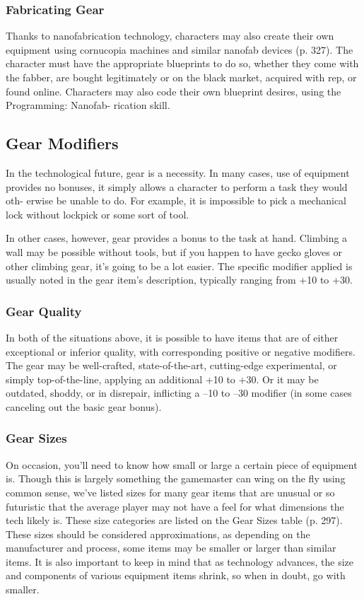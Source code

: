 \subsubsection{Fabricating Gear}

Thanks to nanofabrication technology, characters may 
also create their own equipment using cornucopia 
machines and similar nanofab devices (p. 327). The 
character must have the appropriate blueprints to do 
so, whether they come with the fabber, are bought 
legitimately or on the black market, acquired with rep, 
or found online. Characters may also code their own 
blueprint desires, using the Programming: Nanofab-
rication skill.

\subsection{Gear Modifiers}

In the technological future, gear is a necessity. In many 
cases, use of equipment provides no bonuses, it simply 
allows a character to perform a task they would oth-
erwise be unable to do. For example, it is impossible 
to pick a mechanical lock without lockpick or some 
sort of tool.

In other cases, however, gear provides a bonus to 
the task at hand. Climbing a wall may be possible 
without tools, but if you happen to have gecko gloves 
or other climbing gear, it's going to be a lot easier. The 
specific modifier applied is usually noted in the gear 
item's description, typically ranging from +10 to +30.

\subsubsection{Gear Quality}

In both of the situations above, it is possible to have 
items that are of either exceptional or inferior quality, 
with corresponding positive or negative modifiers. The 
gear may be well-crafted, state-of-the-art, cutting-edge 
experimental, or simply top-of-the-line, applying an 
additional +10 to +30. Or it may be outdated, shoddy, 
or in disrepair, inflicting a –10 to –30 modifier  (in 
some cases canceling out the basic gear bonus).

\subsubsection{Gear Sizes}

On occasion, you'll need to know how small or large 
a certain piece of equipment is. Though this is largely 
something the gamemaster can wing on the fly using 
common sense, we've listed sizes for many gear items 
that are unusual or so futuristic that the average player 
may not have a feel for what dimensions the tech 
likely is. These size categories are listed on the Gear 
Sizes table (p. 297). These sizes should be considered 
approximations, as depending on the manufacturer 
and process, some items may be smaller or larger than 
similar items. It is also important to keep in mind that 
as technology advances, the size and components of 
various equipment items shrink, so when in doubt, go 
with smaller.

